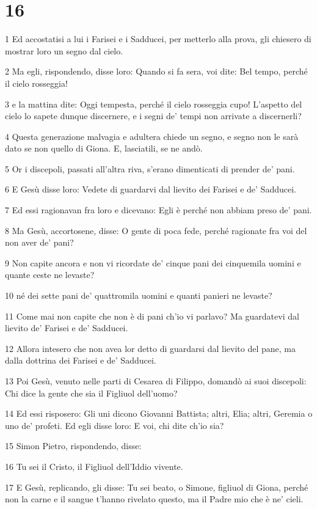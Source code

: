 \chapter{16}

\par 1 Ed accostatisi a lui i Farisei e i Sadducei, per metterlo alla prova, gli chiesero di mostrar loro un segno dal cielo.
\par 2 Ma egli, rispondendo, disse loro: Quando si fa sera, voi dite: Bel tempo, perché il cielo rosseggia!
\par 3 e la mattina dite: Oggi tempesta, perché il cielo rosseggia cupo! L'aspetto del cielo lo sapete dunque discernere, e i segni de' tempi non arrivate a discernerli?
\par 4 Questa generazione malvagia e adultera chiede un segno, e segno non le sarà dato se non quello di Giona. E, lasciatili, se ne andò.
\par 5 Or i discepoli, passati all'altra riva, s'erano dimenticati di prender de' pani.
\par 6 E Gesù disse loro: Vedete di guardarvi dal lievito dei Farisei e de' Sadducei.
\par 7 Ed essi ragionavan fra loro e dicevano: Egli è perché non abbiam preso de' pani.
\par 8 Ma Gesù, accortosene, disse: O gente di poca fede, perché ragionate fra voi del non aver de' pani?
\par 9 Non capite ancora e non vi ricordate de' cinque pani dei cinquemila uomini e quante ceste ne levaste?
\par 10 né dei sette pani de' quattromila uomini e quanti panieri ne levaste?
\par 11 Come mai non capite che non è di pani ch'io vi parlavo? Ma guardatevi dal lievito de' Farisei e de' Sadducei.
\par 12 Allora intesero che non avea lor detto di guardarsi dal lievito del pane, ma dalla dottrina dei Farisei e de' Sadducei.
\par 13 Poi Gesù, venuto nelle parti di Cesarea di Filippo, domandò ai suoi discepoli: Chi dice la gente che sia il Figliuol dell'uomo?
\par 14 Ed essi risposero: Gli uni dicono Giovanni Battista; altri, Elia; altri, Geremia o uno de' profeti. Ed egli disse loro: E voi, chi dite ch'io sia?
\par 15 Simon Pietro, rispondendo, disse:
\par 16 Tu sei il Cristo, il Figliuol dell'Iddio vivente.
\par 17 E Gesù, replicando, gli disse: Tu sei beato, o Simone, figliuol di Giona, perché non la carne e il sangue t'hanno rivelato questo, ma il Padre mio che è ne' cieli.
